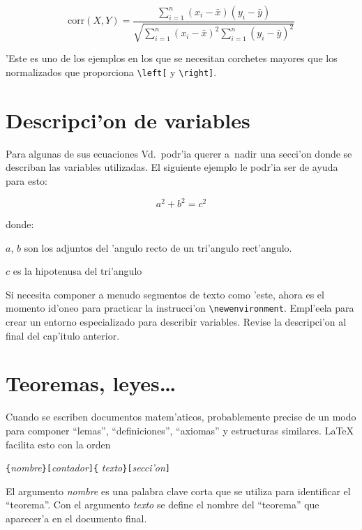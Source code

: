 \begin{example}
\begin{displaymath}
\mathrm{corr}(X,Y)= 
 \frac{\displaystyle 
   \sum_{i=1}^n(x_i-\bar x)
   (y_i-\bar y)} 
  {\displaystyle\sqrt{
 \sum_{i=1}^n(x_i-\bar x)^2
\sum_{i=1}^n(y_i-\bar y)^2}}
\end{displaymath}    
\end{example}
 
\noindent 'Este es uno de los ejemplos en los que se necesitan
corchetes mayores que los normalizados que proporciona %
\verb|\left[| y \verb|\right]|.


\section{Descripci'on de variables}

Para algunas de sus ecuaciones Vd.\ podr'ia querer a~nadir una
secci'on donde se describan las variables utilizadas. El siguiente
ejemplo le podr'ia ser de ayuda para esto:

\begin{example}
\begin{displaymath}
a^2+b^2=c^2
\end{displaymath}
{\settowidth{\parindent}
   {donde:\ }

$a$, $b$ son  
los adjuntos del 'angulo recto
de un tri'angulo rect'angulo.

$c$ es la hipotenusa
del tri'angulo}
\end{example}

Si necesita componer a menudo segmentos de texto como 'este, ahora es
el momento id'oneo para practicar la instrucci'on
\verb|\newenvironment|. Empl'eela para crear un entorno especializado
para describir variables. Revise la
descripci'on al final del cap'itulo anterior.

\section{Teoremas, leyes\ldots}

Cuando se escriben documentos matem'aticos, probablemente precise de
un modo para componer ``lemas'', ``definiciones'', ``axiomas'' y
estructuras similares. \LaTeX{} facilita esto con la orden
\begin{command}
\verb|{|\emph{nombre}\verb|}[|\emph{contador}\verb|]{|%
         \emph{texto}\verb|}[|\emph{secci'on}\verb|]|
\end{command}
El argumento \emph{nombre} es una palabra clave corta que se utiliza
para identificar el ``teorema''. Con el argumento \emph{texto} se
define el nombre del ``teorema'' que aparecer'a en el documento final.

